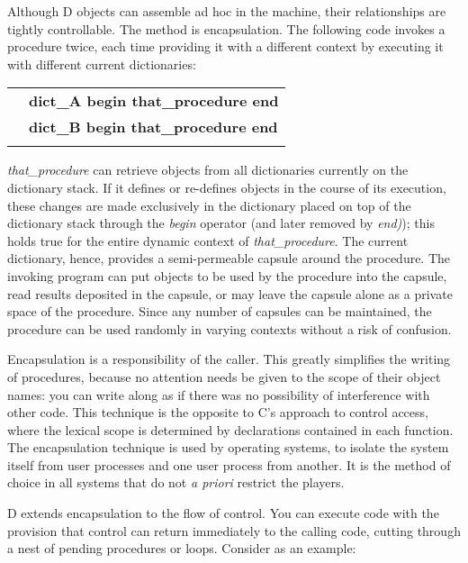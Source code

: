 Although  D  objects  can  assemble  ad  hoc  in  the   machine,   their relationships are tightly controllable.  The method is encapsulation. The following code invokes a procedure twice,  each time providing it with  a different context by executing it with different current dictionaries:\\

\begin{tabular}{>{\normalfont}l>{\sffamily\bfseries}l}
 & dict\_A begin that\_procedure end\\
 & dict\_B begin that\_procedure end\\\\
\end{tabular}

\noindent \emph{that\_procedure} can retrieve objects from all dictionaries currently  on the dictionary stack.  If it defines or re-defines objects in the  course of  its execution,  these changes are made exclusively in the  dictionary placed  on  top of the dictionary stack through the \emph{begin} operator  (and later removed by \emph{end)});  this holds true for the entire dynamic context of \emph{that\_procedure}.  The current dictionary, hence, provides a semi-permeable capsule around the procedure.  The invoking program can put objects to be used  by the procedure into the capsule,  read results deposited  in  the capsule,  or  may  leave  the capsule alone as a  private  space  of  the procedure.  Since any number of capsules can be maintained, the procedure can be used randomly in varying contexts without a risk of confusion.

Encapsulation is a responsibility of the caller. This greatly simplifies the  writing of procedures,  because no attention needs be given  to  the scope  of  their object names:  you can write along as if  there  was  no possibility  of  interference  with other code.  This  technique  is  the opposite  to C's approach to control access,  where the lexical scope  is determined by declarations contained in each function.  The encapsulation technique is used by operating systems, to isolate the system itself from user  processes and one user process from another.  It is the  method  of choice in all systems that do not \emph{a priori} restrict the players.

D  extends encapsulation to the flow of control.  You can  execute  code with  the  provision that control can return immediately to  the  calling code,  cutting through a nest of pending procedures or loops. Consider as an example:\\

